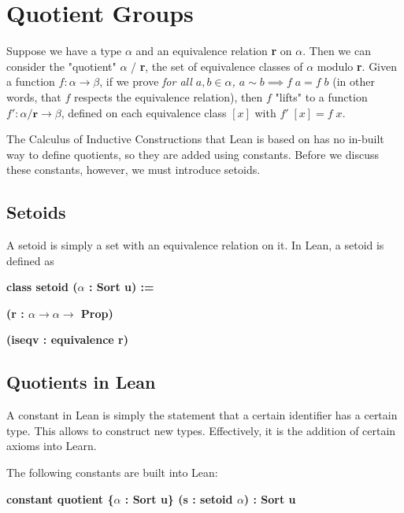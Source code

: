 \documentclass[runningheads,a4paper]{llncs}
\renewcommand{\a}{\alpha}
\renewcommand{\b}{\beta}
\renewcommand{\-}{\setminus}
\begin{document}
\section{Quotient Groups}

Suppose we have a type $\a$ and an equivalence relation \textbf{r} on $\a$. Then we can consider the "quotient" $\a$ / \textbf{r}, the set of equivalence classes of $\a$ modulo \textbf{r}. Given a function $f : \a \to \b$, if we prove \textit{for all $a, b \in \a$, $a \sim b \implies f \; a = f\; b$} (in other words, that $f$ respects the equivalence relation), then $f$ "lifts" to a function $f' : \a / \textbf{r} \to \b$, defined on each equivalence class $[x]$ with $f'\; [x] = f\; x$.

The Calculus of Inductive Constructions that Lean is based on has no in-built way to define quotients, so they are added using constants. Before we discuss these constants, however, we must introduce setoids.

\subsection{Setoids}

A setoid is simply a set with an equivalence relation on it. In Lean, a setoid is defined as

\vspace{2 mm}
\hspace{2 em}\textbf{class setoid ($\a$ : Sort u) :=}

\hspace{4 em}\textbf{(r : $\a \to \a \to$ Prop)}

\hspace{4 em}\textbf{(iseqv : equivalence r)}
\vspace{2 mm}

\subsection{Quotients in Lean}

A constant in Lean is simply the statement that a certain identifier has a certain type. This allows to construct new types. Effectively, it is the addition of certain axioms into Learn. 

The following constants are built into Lean:

\vspace{2 mm}
\hspace{2 em}\textbf{constant quotient \{$\a$ : Sort u\} (s : setoid $\a$) : Sort u}
\end{document}
